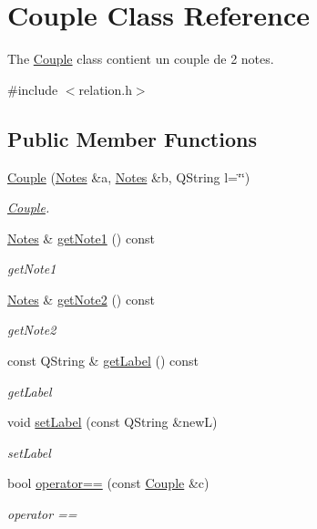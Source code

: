 \hypertarget{class_couple}{}\section{Couple Class Reference}
\label{class_couple}


The \hyperlink{class_couple}{Couple} class contient un couple de 2 notes.  




{\ttfamily \#include $<$relation.\+h$>$}

\subsection*{Public Member Functions}
\begin{DoxyCompactItemize}
\item 
\hyperlink{class_couple_abe99267749e9b76abe4401c1f888f354}{Couple} (\hyperlink{class_notes}{Notes} \&a, \hyperlink{class_notes}{Notes} \&b, Q\+String l=\char`\"{}\char`\"{})
\begin{DoxyCompactList}\small\item\em \hyperlink{class_couple}{Couple}. \end{DoxyCompactList}\item 
\hyperlink{class_notes}{Notes} \& \hyperlink{class_couple_acd88fe5ee43929a72a95c6c5129e6fbd}{get\+Note1} () const
\begin{DoxyCompactList}\small\item\em get\+Note1 \end{DoxyCompactList}\item 
\hyperlink{class_notes}{Notes} \& \hyperlink{class_couple_a8e9f87f1c450bf8c21514a04b7734c45}{get\+Note2} () const
\begin{DoxyCompactList}\small\item\em get\+Note2 \end{DoxyCompactList}\item 
const Q\+String \& \hyperlink{class_couple_a0f04e0130d4d44ce39e322033d85a8df}{get\+Label} () const
\begin{DoxyCompactList}\small\item\em get\+Label \end{DoxyCompactList}\item 
void \hyperlink{class_couple_aa2369d7e4e139a7dcba583b4688536bf}{set\+Label} (const Q\+String \&newL)
\begin{DoxyCompactList}\small\item\em set\+Label \end{DoxyCompactList}\item 
bool \hyperlink{class_couple_a493af8c8763ceef4cadf82787a3ccf47}{operator==} (const \hyperlink{class_couple}{Couple} \&c)
\begin{DoxyCompactList}\small\item\em operator == \end{DoxyCompactList}\end{DoxyCompactItemize}


